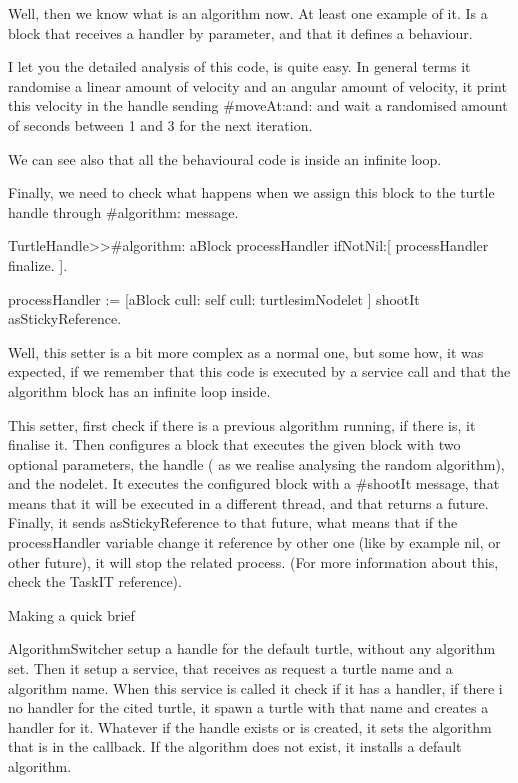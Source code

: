 \documentclass[a4paper,10pt,twoside]{book}
\begin{document}
			
			Well, then we know what is an algorithm now. At least one example of it. Is a block that receives a handler by parameter, and that it defines a behaviour. 
			
			I let you the detailed analysis of this code, is quite easy. In general terms it randomise a linear amount of velocity and an angular amount of velocity, it print this velocity in the handle sending \#moveAt:and: and wait a randomised amount of seconds between 1 and 3 for the next iteration.
			
			We can see also that all the behavioural code is inside an infinite loop. 		
			
			
			Finally, we need to check what happens when we assign this block to the turtle handle through \#algorithm: message.
						
			
			\begin{code}
TurtleHandle>>#algorithm: aBlock
	processHandler ifNotNil:[
		processHandler finalize.
	].

	 processHandler := [aBlock cull: self cull: turtlesimNodelet ] shootIt asStickyReference.
			\end{code}
			
			Well, this setter is a bit more complex as a normal one, but some how, it was expected, if we remember that this code is executed by a service call and that the algorithm block has an infinite loop inside.
			
			This setter, first check if there is a previous algorithm running, if there is, it finalise it. Then configures a block that executes the given block with two optional parameters, the handle ( as we realise analysing the random algorithm), and the nodelet.  It executes the configured block with a \#shootIt message, that means that it will be executed in a different thread, and that returns a future. Finally,  it sends asStickyReference to that future, what means that if the processHandler variable change it reference by other one (like by example nil, or other future), it will stop the related process. (For more information about this, check the TaskIT reference).
			
			
			
			Making a quick brief 
			
			AlgorithmSwitcher setup a handle for the default turtle, without any algorithm set. Then it setup a service, that receives as request a turtle name and a algorithm name. When this service is called it check if it has a handler, if there i no handler for the cited turtle, it spawn a turtle with that name and creates a handler for it. Whatever if the handle exists or is created, it sets the algorithm that is in the callback. If the algorithm does not exist, it installs a default algorithm. 
						
\end{document}
